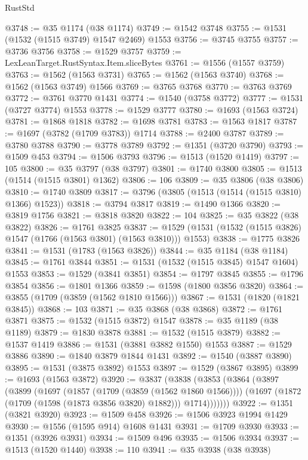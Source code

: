 \begin{lexlean}{RustStd}
\begin{coremodule}
@3748 := @35 @1174 (@38 @1174)
@3749 := @1542 @3748
@3755 := @1531 (@1532 (@1515 @3749) @1547 @2469) @1553
@3756 := @3745 @3755
@3757 := @3736 @3756
@3758 := @1529 @3757
@3759 := LexLeanTarget.RustSyntax.Item.sliceBytes
@3761 := @1556 (@1557 @3759)
@3763 := @1562 (@1563 @3731)
@3765 := @1562 (@1563 @3740)
@3768 := @1562 (@1563 @3749) @1566
@3769 := @3765 @3768
@3770 := @3763 @3769
@3772 := @3761 @3770 @1431
@3774 := @1540 (@3758 @3772)
@3777 := @1531 (@3727 @3774) @1553
@3778 := @1529 @3777
@3780 := @1693 (@1563 @3724)
@3781 := @1868 @1818
@3782 := @1698 @3781
@3783 := @1563 @1817
@3787 := @1697 (@3782 (@1709 @3783)) @1714
@3788 := @2400 @3787
@3789 := @3780 @3788
@3790 := @3778 @3789
@3792 := @1351 (@3720 @3790)
@3793 := @1509 @453
@3794 := @1506 @3793
@3796 := @1513 (@1520 @1419)
@3797 := 105
@3800 := @35 @3797 (@38 @3797)
@3801 := @1740 @3800
@3805 := @1513 (@1514 (@1515 @3801) @1362)
@3806 := 106
@3809 := @35 @3806 (@38 @3806)
@3810 := @1740 @3809
@3817 := @3796 (@3805 (@1513 (@1514 (@1515 @3810) @1366) @1523))
@3818 := @3794 @3817
@3819 := @1490 @1366
@3820 := @3819 @1756
@3821 := @3818 @3820
@3822 := 104
@3825 := @35 @3822 (@38 @3822)
@3826 := @1761 @3825
@3837 := @1529 (@1531 (@1532 (@1515 @3826) @1547 (@1766 (@1563 @3801) (@1563 @3810))) @1553)
@3838 := @1775 @3826
@3841 := @1531 (@1783 (@1563 @3826))
@3844 := @35 @1184 (@38 @1184)
@3845 := @1761 @3844
@3851 := @1531 (@1532 (@1515 @3845) @1547 @1604) @1553
@3853 := @1529 (@3841 @3851)
@3854 := @1797 @3845
@3855 := @1796 @3854
@3856 := @1801 @1366
@3859 := @1598 (@1800 @3856 @3820)
@3864 := @3855 (@1709 (@3859 (@1562 @1810 @1566)))
@3867 := @1531 (@1820 (@1821 @3845))
@3868 := 103
@3871 := @35 @3868 (@38 @3868)
@3872 := @1761 @3871
@3875 := @1532 (@1515 @3872) @1547
@3878 := @35 @1189 (@38 @1189)
@3879 := @1830 @3878
@3881 := @1532 (@1515 @3879)
@3882 := @1537 @1419
@3886 := @1531 (@3881 @3882 @1550) @1553
@3887 := @1529 @3886
@3890 := @1840 @3879 @1844 @1431
@3892 := @1540 (@3887 @3890)
@3895 := @1531 (@3875 @3892) @1553
@3897 := @1529 (@3867 @3895)
@3899 := @1693 (@1563 @3872)
@3920 := @3837
    (@3838
      (@3853
        (@3864
          (@3897
            (@3899
              (@1697
                (@1857 (@1709 (@3859 (@1562 @1860 @1566))))
                (@1697 (@1872 (@1709 (@1598 (@1873 @3856 @3820) @1882))) @1714)))))))
@3922 := @1351 (@3821 @3920)
@3923 := @1509 @458
@3926 := @1506 @3923 @1994 @1429
@3930 := @1556 (@1595 @914) @1608 @1431
@3931 := @1709 @3930
@3933 := @1351 (@3926 @3931)
@3934 := @1509 @496
@3935 := @1506 @3934
@3937 := @1513 (@1520 @1440)
@3938 := 110
@3941 := @35 @3938 (@38 @3938)

\end{coremodule}
\end{lexlean}
